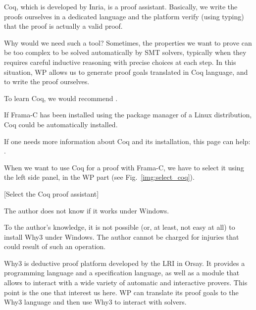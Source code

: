 Coq, which is developed by Inria, is a proof assistant. Basically, we
write the proofs ourselves in a dedicated language and the platform
verify (using typing) that the proof is actually a valid proof.



Why would we need such a tool? Sometimes, the properties we want to
prove can be too complex to be solved automatically by SMT solvers,
typically when they requires careful inductive reasoning with precise
choices at each step. In this situation, WP allows us to generate proof
goals translated in Coq language, and to write the proof ourselves.




To learn Coq, we would recommend
.



\begin{Information}
  If Frama-C has been installed using the package manager of a Linux
  distribution, Coq could be automatically installed.
\end{Information}


If one needs more information about Coq and its installation, this page
can help: .



When we want to use Coq for a proof with Frama-C, we have to select it
using the left side panel, in the WP part (see Fig.~\ref{img:select_coq}).



[Select the Coq proof assistant]


\begin{Information}
  The author does not know if it works under Windows.
\end{Information}




\begin{Warning}
  To the author's knowledge, it is not possible (or, at least, not easy
  at all) to install Why3 under Windows. The author cannot be charged for
  injuries that could result of such an operation.
\end{Warning}


Why3 is deductive proof platform developed by the LRI in Orsay. It
provides a programming language and a specification language, as well as
a module that allows to interact with a wide variety of automatic and
interactive provers. This point is the one that interest us here. WP can
translate its proof goals to the Why3 language and then use Why3 to
interact with solvers.



